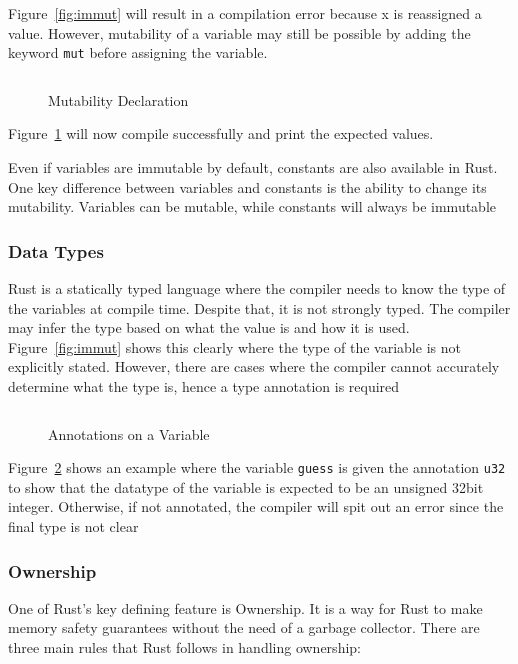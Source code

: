 \documentclass{article}
\newcommand{\rust}[1]{\inputminted{rust}{samples/rust/#1.rs}}
\newcommand{\rustin}[1]{\texttt{#1}}
\begin{document}
  Figure~\ref{fig:immut} will result in a compilation error because x is
  reassigned a value. However, mutability of a variable may still be possible by
  adding the keyword \rustin{mut} before assigning the variable.

  \begin{figure}[ht]
    \rust{mutability}
    \caption{Mutability Declaration}
    \label{fig:mut}
  \end{figure}

  Figure~\ref{fig:mut} will now compile successfully and print the expected
  values.

  Even if variables are immutable by default, constants are also available in
  Rust. One key difference between variables and constants is the ability to
  change its mutability. Variables can be mutable, while constants will always
  be immutable

  \subsubsection{Data Types}
  Rust is a statically typed language where the compiler needs to know the type
  of the variables at compile time. Despite that, it is not strongly typed. The
  compiler may infer the type based on what the value is and how it is used.
  Figure~\ref{fig:immut} shows this clearly where the type of the variable is
  not explicitly stated. However, there are cases where the compiler cannot
  accurately determine what the type is, hence a type annotation is required

  \begin{figure}[ht]
    \rust{annotations}
    \caption{Annotations on a Variable}
    \label{fig:annot}
  \end{figure}

  Figure~\ref{fig:annot} shows an example where the variable \rustin{guess} is
  given the annotation \rustin{u32} to show that the datatype of the variable is
  expected to be an unsigned 32bit integer. Otherwise, if not annotated, the
  compiler will spit out an error since the final type is not clear

  \subsubsection{Ownership}
  One of Rust's key defining feature is Ownership. It is a way for Rust to make
  memory safety guarantees without the need of a garbage collector. There are
  three main rules that Rust follows in handling ownership:
\end{document}
